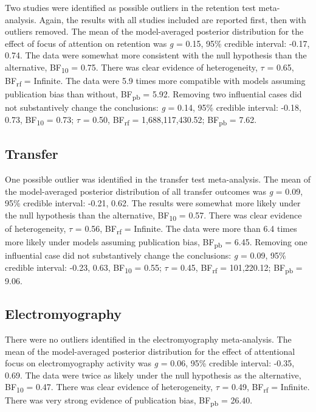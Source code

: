 \documentclass[man,floatsintext,letterpaper,12pt]{apa7}
\begin{document}
Two studies \autocite{ahmad2013-meta,tse2019-meta} were identified as possible outliers in the retention test meta-analysis. Again, the results with all studies included are reported first, then with outliers removed. The mean of the model-averaged posterior distribution for the effect of focus of attention on retention was \emph{g} = 0.15, 95\% credible interval: -0.17, 0.74. The data were somewhat more consistent with the null hypothesis than the alternative, BF\textsubscript{10} = 0.75. There was clear evidence of heterogeneity, $\tau$ = 0.65, BF\textsubscript{rf} = Infinite. The data were 5.9 times more compatible with models assuming publication bias than without, BF\textsubscript{pb} = 5.92. Removing two influential cases did not substantively change the conclusions: \emph{g} = 0.14, 95\% credible interval: -0.18, 0.73, BF\textsubscript{10} = 0.73; $\tau$ = 0.50, BF\textsubscript{rf} = 1,688,117,430.52; BF\textsubscript{pb} = 7.62.

\subsection{Transfer}

One possible outlier \autocite{tse2019-meta} was identified in the transfer test meta-analysis. The mean of the model-averaged posterior distribution of all transfer outcomes was \emph{g} = 0.09, 95\% credible interval: -0.21, 0.62. The results were somewhat more likely under the null hypothesis than the alternative, BF\textsubscript{10} = 0.57. There was clear evidence of heterogeneity, $\tau$ = 0.56, BF\textsubscript{rf} = Infinite. The data were more than 6.4 times more likely under models assuming publication bias, BF\textsubscript{pb} = 6.45. Removing one influential case did not substantively change the conclusions: \emph{g} = 0.09, 95\% credible interval: -0.23, 0.63, BF\textsubscript{10} = 0.55; $\tau$ = 0.45, BF\textsubscript{rf} = 101,220.12; BF\textsubscript{pb} = 9.06.

\subsection{Electromyography}

There were no outliers identified in the electromyography meta-analysis. The mean of the model-averaged posterior distribution for the effect of attentional focus on electromyography activity was \emph{g} = 0.06, 95\% credible interval: -0.35, 0.69. The data were twice as likely under the null hypothesis as the alternative, BF\textsubscript{10} = 0.47. There was clear evidence of heterogeneity, $\tau$ = 0.49, BF\textsubscript{rf} = Infinite. There was very strong evidence of publication bias, BF\textsubscript{pb} = 26.40.
\end{document}
